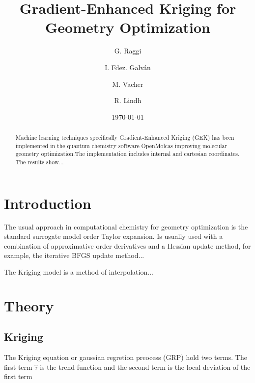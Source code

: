 \documentclass[aps,prb,twocolumn,superscriptaddress,floatfix,longbibliography,10pt]{revtex4-2}
\begin{document}
\title{Gradient-Enhanced Kriging for Geometry Optimization}

\author{G. Raggi}
\author{I. Fdez. Galv\'{a}n}
\author{M. Vacher} 
\author{R. Lindh}

\date{\today}

\begin{abstract}
Machine learning techniques specifically Gradient-Enhanced Kriging (GEK) has been implemented in the quantum chemistry software OpenMolcas\cite{Aquilante2016} improving molecular geometry optimization.The implementation includes internal and cartesian coordinates. The results show...
\end{abstract}

\maketitle
\section{\label{sec:Start}Introduction}
The usual approach in computational chemistry for geometry optimization is the standard surrogate model  order Taylor expansion\cite{Schlegel2011, Thøgersen2004}. Is usually used  with a combination of approximative  order derivatives and a Hessian update method, for example, the iterative BFGS update method...

\vspace{1mm}

The Kriging model is a method of interpolation...

\vspace{-2mm}

\section{\label{sec:Theory}Theory}

\subsection{Kriging}

The Kriging equation or gaussian regretion preocess (GRP) hold two terms. The first term $\hat{\tau}$ is the trend function and the second term is the local deviation of the first term\citep{Ulaganathan2016}
\end{document}
